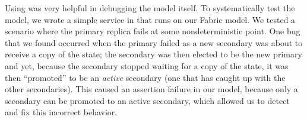 Using \psharp was very helpful in debugging the model itself.
To systematically test the model,
we wrote a simple service in \psharp
that runs on our \psharp Fabric model.
We tested a scenario where the primary replica
fails at some nondeterministic point.
One bug that we found
occurred when
the primary
failed
as a new secondary 
was about to receive a copy of the state;
the secondary was then elected to be the new primary
and yet, because the secondary stopped waiting for
a copy of the state, it was
then ``promoted'' to be an \emph{active} secondary
(one that has caught up with the other secondaries).
This caused an assertion failure in our model,
because only a secondary can be promoted to an active secondary, 
which allowed us to detect and fix this incorrect behavior.




